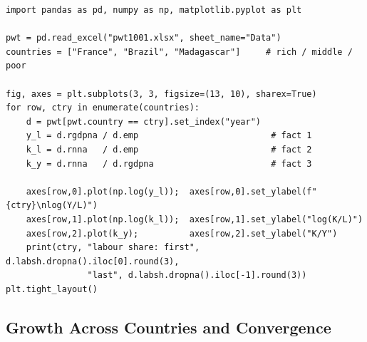 \documentclass[12pt, letterpaper]{article}
\begin{document}
\begin{tcolorbox}[evenbox,title={Problem 3.2 \quad The Kaldor Facts in Other Countries}]
\begin{tcolorbox}[theorybox,title={Code}]
\footnotesize
\begin{verbatim}
import pandas as pd, numpy as np, matplotlib.pyplot as plt

pwt = pd.read_excel("pwt1001.xlsx", sheet_name="Data")
countries = ["France", "Brazil", "Madagascar"]     # rich / middle / poor

fig, axes = plt.subplots(3, 3, figsize=(13, 10), sharex=True)
for row, ctry in enumerate(countries):
    d = pwt[pwt.country == ctry].set_index("year")
    y_l = d.rgdpna / d.emp                          # fact 1
    k_l = d.rnna   / d.emp                          # fact 2
    k_y = d.rnna   / d.rgdpna                       # fact 3

    axes[row,0].plot(np.log(y_l));  axes[row,0].set_ylabel(f"{ctry}\nlog(Y/L)")
    axes[row,1].plot(np.log(k_l));  axes[row,1].set_ylabel("log(K/L)")
    axes[row,2].plot(k_y);          axes[row,2].set_ylabel("K/Y")
    print(ctry, "labour share: first", d.labsh.dropna().iloc[0].round(3),
                "last", d.labsh.dropna().iloc[-1].round(3))
plt.tight_layout()
\end{verbatim}
\end{tcolorbox}
\end{tcolorbox}

\subsection{Growth Across Countries and Convergence}
\end{document}
